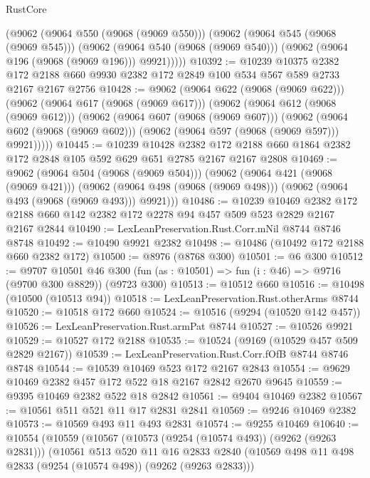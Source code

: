 \begin{lexlean}{RustCore}
\begin{coremodule}
      (@9062
        (@9064 @550 (@9068 (@9069 @550)))
        (@9062
          (@9064 @545 (@9068 (@9069 @545)))
          (@9062
            (@9064 @540 (@9068 (@9069 @540)))
            (@9062 (@9064 @196 (@9068 (@9069 @196))) @9921)))))
@10392 := @10239
    @10375
    @2382
    @172
    @2188
    @660
    @9930
    @2382
    @172
    @2849
    @100
    @534
    @567
    @589
    @2733
    @2167
    @2167
    @2756
@10428 := @9062
    (@9064 @622 (@9068 (@9069 @622)))
    (@9062
      (@9064 @617 (@9068 (@9069 @617)))
      (@9062
        (@9064 @612 (@9068 (@9069 @612)))
        (@9062
          (@9064 @607 (@9068 (@9069 @607)))
          (@9062
            (@9064 @602 (@9068 (@9069 @602)))
            (@9062 (@9064 @597 (@9068 (@9069 @597))) @9921)))))
@10445 := @10239
    @10428
    @2382
    @172
    @2188
    @660
    @1864
    @2382
    @172
    @2848
    @105
    @592
    @629
    @651
    @2785
    @2167
    @2167
    @2808
@10469 := @9062
    (@9064 @504 (@9068 (@9069 @504)))
    (@9062
      (@9064 @421 (@9068 (@9069 @421)))
      (@9062 (@9064 @498 (@9068 (@9069 @498))) (@9062 (@9064 @493 (@9068 (@9069 @493))) @9921)))
@10486 := @10239
    @10469
    @2382
    @172
    @2188
    @660
    @142
    @2382
    @172
    @2278
    @94
    @457
    @509
    @523
    @2829
    @2167
    @2167
    @2844
@10490 := LexLeanPreservation.Rust.Corr.mNil @8744 @8746 @8748
@10492 := @10490 @9921 @2382
@10498 := @10486 (@10492 @172 @2188 @660 @2382 @172)
@10500 := @8976 (@8768 @300)
@10501 := @6 @300
@10512 := @9707
    @10501
    @46
    @300
    (fun (as : @10501) => fun (i : @46) => @9716 (@9700 @300 @8829))
    (@9723 @300)
@10513 := @10512 @660
@10516 := @10498 (@10500 (@10513 @94))
@10518 := LexLeanPreservation.Rust.otherArms @8744
@10520 := @10518 @172 @660
@10524 := @10516 (@9294 (@10520 @142 @457))
@10526 := LexLeanPreservation.Rust.armPat @8744
@10527 := @10526 @9921
@10529 := @10527 @172 @2188
@10535 := @10524 (@9169 (@10529 @457 @509 @2829 @2167))
@10539 := LexLeanPreservation.Rust.Corr.fOfB @8744 @8746 @8748
@10544 := @10539 @10469 @523 @172 @2167 @2843
@10554 := @9629 @10469 @2382 @457 @172 @522 @18 @2167 @2842 @2670 @9645
@10559 := @9395 @10469 @2382 @522 @18 @2842
@10561 := @9404 @10469 @2382
@10567 := @10561 @511 @521 @11 @17 @2831 @2841
@10569 := @9246 @10469 @2382
@10573 := @10569 @493 @11 @493 @2831
@10574 := @9255 @10469
@10640 := @10554
    (@10559
      (@10567
        (@10573 (@9254 (@10574 @493)) (@9262 (@9263 @2831)))
        (@10561
          @513
          @520
          @11
          @16
          @2833
          @2840
          (@10569 @498 @11 @498 @2833 (@9254 (@10574 @498)) (@9262 (@9263 @2833)))

\end{coremodule}
\end{lexlean}
